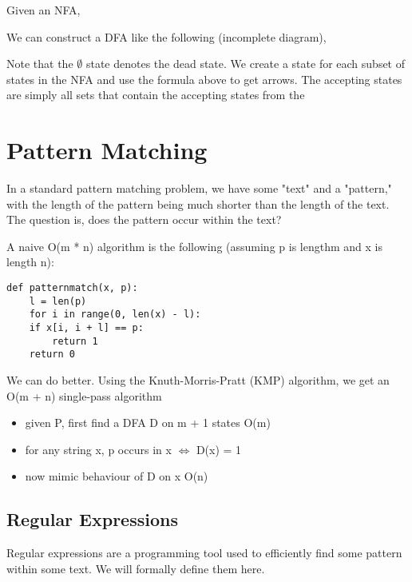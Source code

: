 \begin{example}
    Given an NFA,
    \begin{center}
    \end{center}

    We can construct a DFA like the following (incomplete diagram),
    \begin{center}
    \end{center}

    Note that the $\emptyset$ state denotes the dead state. We create a state for each subset of states in the NFA and use the formula above to get arrows. The accepting states are simply all sets that contain the accepting states from the
\end{example}

\section{Pattern Matching}
In a standard pattern matching problem, we have some 
"text" and a "pattern," with the length of the pattern being much shorter than the length of the text. The question is, does the pattern occur within the text?

A naive O(m * n) algorithm is the following (assuming p is lengthm and x is length n):
\begin{verbatim}
def patternmatch(x, p):
    l = len(p)
    for i in range(0, len(x) - l):
    if x[i, i + l] == p:
        return 1
    return 0
\end{verbatim}

We can do better. Using the Knuth-Morris-Pratt (KMP) algorithm, we get an O(m + n) single-pass algorithm
\begin{itemize}
    \item given P, first find a DFA D on m + 1 states O(m)
    \item for any string x, p occurs in x $\iff$ D(x) = 1
    \item now mimic behaviour of D on x O(n)
\end{itemize}

\hr

\subsection*{Regular Expressions}
Regular expressions are a programming tool used to efficiently find some pattern within some text. We will formally define them here.

